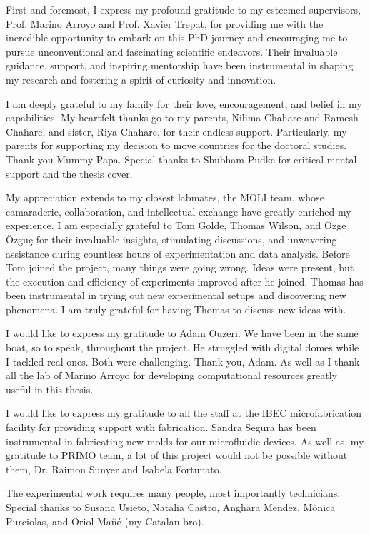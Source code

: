 \begin{Acknowledgements}
	First and foremost, I express my profound gratitude to my esteemed supervisors, Prof. Marino Arroyo and Prof. Xavier Trepat, for providing me with the incredible opportunity to embark on this PhD journey and encouraging me to pursue unconventional and fascinating scientific endeavors. Their invaluable guidance, support, and inspiring mentorship have been instrumental in shaping my research and fostering a spirit of curiosity and innovation.
	
	I am deeply grateful to my family for their love, encouragement, and belief in my capabilities. My heartfelt thanks go to my parents, Nilima Chahare and Ramesh Chahare, and sister, Riya Chahare, for their endless support. Particularly, my parents for supporting my decision to move countries for the doctoral studies. Thank you Mummy-Papa. Special thanks to Shubham Pudke for critical mental support and the thesis cover.
	
	My appreciation extends to my closest labmates, the MOLI team, whose camaraderie, collaboration, and intellectual exchange have greatly enriched my experience. I am especially grateful to Tom Golde, Thomas Wilson, and Özge Özguç for their invaluable insights, stimulating discussions, and unwavering assistance during countless hours of experimentation and data analysis. Before Tom joined the project, many things were going wrong. Ideas were present, but the execution and efficiency of experiments improved after he joined. Thomas has been instrumental in trying out new experimental setups and discovering new phenomena. I am truly grateful for having Thomas to discuss new ideas with.
	
	I would like to express my gratitude to Adam Ouzeri. We have been in the same boat, so to speak, throughout the project. He struggled with digital domes while I tackled real ones. Both were challenging. Thank you, Adam. As well as I thank all the lab of Marino Arroyo for developing  computational resources greatly useful in this thesis.
	
	I would like to express my gratitude to all the staff at the IBEC microfabrication facility for providing support with fabrication. Sandra Segura has been instrumental in fabricating new molds for our microfluidic devices. As well as, my gratitude to PRIMO team, a lot of this project would not be possible without them, Dr. Raimon Sunyer and Isabela Fortunato.
	
	The experimental work requires many people, most importantly technicians. Special thanks to Susana Usieto, Natalia Castro, Anghara Mendez, Mònica Purciolas, and Oriol Mañé (my Catalan bro).
	

\end{Acknowledgements}

